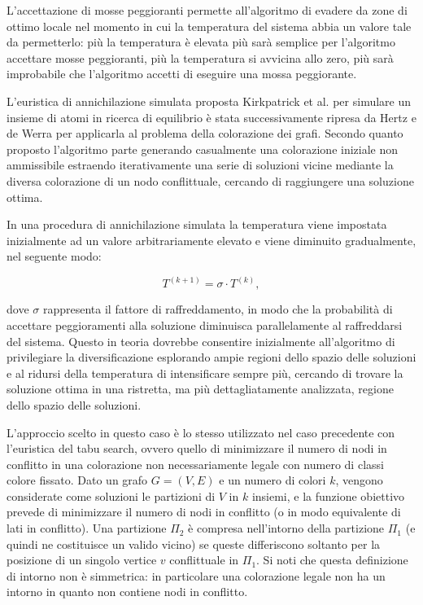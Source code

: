 \documentclass[a4paper,10pt]{article}
\begin{document}
L'accettazione di mosse peggioranti permette all'algoritmo di evadere da zone di ottimo locale nel momento in cui la temperatura del sistema abbia un valore tale da permetterlo: più la temperatura è elevata più sarà semplice per l'algoritmo accettare mosse peggioranti, più la temperatura si avvicina allo zero, più sarà improbabile che l'algoritmo accetti di eseguire una mossa peggiorante.

L'euristica di annichilazione simulata proposta Kirkpatrick et al.\cite{sa} per simulare un insieme di atomi in ricerca di equilibrio è stata successivamente  ripresa da Hertz e de Werra\cite{sa_hertz_dewerra} per applicarla al problema della colorazione dei grafi. Secondo quanto proposto l'algoritmo parte generando casualmente una colorazione iniziale non ammissibile estraendo iterativamente una serie di soluzioni vicine mediante la diversa colorazione di un nodo conflittuale, cercando di raggiungere una soluzione ottima. 

In una procedura di annichilazione simulata la temperatura viene impostata inizialmente ad un valore arbitrariamente elevato e viene diminuito gradualmente, nel seguente modo:

\begin{displaymath}
 T^{(k+1)}=\sigma \cdot T^{(k)},
\end{displaymath}

dove $\sigma$ rappresenta il fattore di raffreddamento, in modo che la probabilità di accettare peggioramenti alla soluzione diminuisca parallelamente al raffreddarsi del sistema. Questo in teoria dovrebbe consentire inizialmente all'algoritmo di privilegiare la diversificazione esplorando ampie regioni dello spazio delle soluzioni e al ridursi della temperatura di intensificare sempre più, cercando di trovare la soluzione ottima in una ristretta, ma più dettagliatamente analizzata, regione dello spazio delle soluzioni.

L'approccio scelto in questo caso è lo stesso utilizzato nel caso precedente con l'euristica del tabu search, ovvero quello di minimizzare il numero di nodi in conflitto in una colorazione non necessariamente legale con numero di classi colore fissato.
Dato un grafo $G=(V,E)$ e un numero di colori $k$, vengono considerate come soluzioni le partizioni di $V$ in $k$ insiemi, e la funzione obiettivo prevede di minimizzare il numero di nodi in conflitto (o in modo equivalente di lati in conflitto). Una partizione $\Pi_{2}$ è compresa nell'intorno della partizione $\Pi_{1}$ (e quindi ne costituisce un valido vicino) se queste differiscono soltanto per la posizione di un singolo vertice $v$ conflittuale in $\Pi_{1}$. Si noti che questa definizione di intorno non è simmetrica: in particolare una colorazione legale non ha un intorno in quanto non contiene nodi in conflitto.
\end{document}
